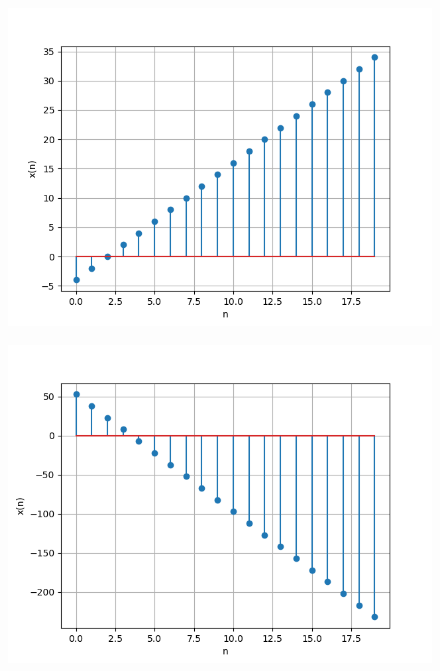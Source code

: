 \documentclass[journal,12pt,twocolumn]{IEEEtran}
\theoremstyle{remark}
\begin{document}
\begin{figure}[h] 
      \centering
       \includegraphics[width=1\linewidth]{ncert-maths/10/5/2/3/figs/plot4.png} %
        \caption{}
    \end{figure}
    
\begin{figure}[h]
      \centering
       \includegraphics[width=1\linewidth]{ncert-maths/10/5/2/3/figs/plot5.png} %
        \caption{}
\end{figure}
\end{document}
